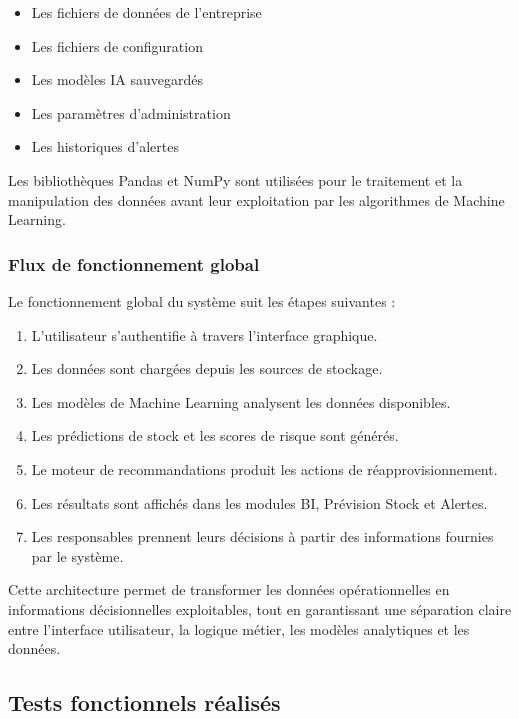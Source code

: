 \begin{itemize}
    \item Les fichiers de données de l'entreprise 
    \item Les fichiers de configuration 
    \item Les modèles IA sauvegardés 
    \item Les paramètres d'administration 
    \item Les historiques d'alertes
\end{itemize}

Les bibliothèques Pandas et NumPy sont utilisées pour le traitement et la manipulation des données avant leur exploitation par les algorithmes de Machine Learning.

\subsubsection{Flux de fonctionnement global}

Le fonctionnement global du système suit les étapes suivantes :

\begin{enumerate}
    \item L'utilisateur s'authentifie à travers l'interface graphique.
    \item Les données sont chargées depuis les sources de stockage.
    \item Les modèles de Machine Learning analysent les données disponibles.
    \item Les prédictions de stock et les scores de risque sont générés.
    \item Le moteur de recommandations produit les actions de réapprovisionnement.
    \item Les résultats sont affichés dans les modules BI, Prévision Stock et Alertes.
    \item Les responsables prennent leurs décisions à partir des informations fournies par le système.
\end{enumerate}

Cette architecture permet de transformer les données opérationnelles en informations décisionnelles exploitables, tout en garantissant une séparation claire entre l'interface utilisateur, la logique métier, les modèles analytiques et les données.


\subsection{Tests fonctionnels réalisés}

